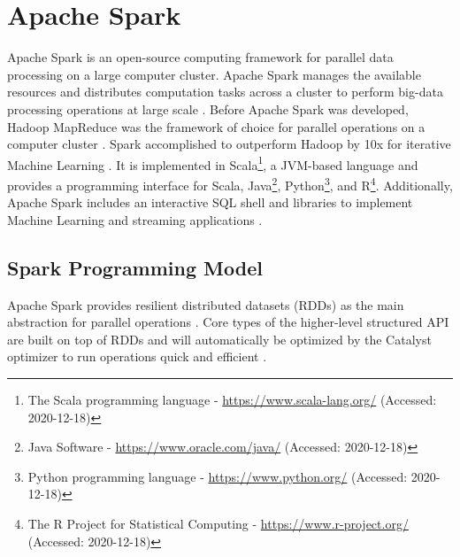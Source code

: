 \section{Apache Spark}
\label{sec:04_spark}
Apache Spark is an open-source computing framework for parallel data processing on a large computer cluster. Apache Spark manages the available resources and distributes computation tasks across a cluster to perform big-data processing operations at large scale \cite{Chambers2018Spark}. Before Apache Spark was developed, Hadoop MapReduce \cite{Dean2010MapReduce} was the framework of choice for parallel operations on a computer cluster \cite{Zaharia2010Spark}. Spark accomplished to outperform Hadoop by 10x for iterative Machine Learning \cite{Zaharia2010Spark}. It is implemented in Scala\footnote{The Scala programming language - \url{https://www.scala-lang.org/} (Accessed: 2020-12-18)}, a JVM-based language and provides a programming interface for Scala, Java\footnote{Java Software - \url{https://www.oracle.com/java/} (Accessed: 2020-12-18)}, Python\footnote{Python programming language - \url{https://www.python.org/} (Accessed: 2020-12-18)}, and R\footnote{The R Project for Statistical Computing - \url{https://www.r-project.org/} (Accessed: 2020-12-18)}. Additionally, Apache Spark includes an interactive SQL shell and libraries to implement Machine Learning and streaming applications \cite{Chambers2018Spark}.


\subsection{Spark Programming Model}
\label{subsec:04_spark_pr-model}
Apache Spark provides resilient distributed datasets (RDDs) as the main abstraction for parallel operations \cite{Zaharia2010Spark}. Core types of the higher-level structured API are built on top of RDDs and will automatically be optimized by the Catalyst optimizer to run operations quick and efficient \cite{Chambers2018Spark, Hien2018Spark}.


